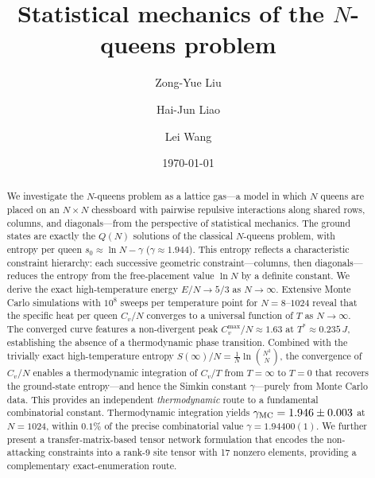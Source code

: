 \documentclass[aps, pre, reprint, amsmath, amssymb, superscriptaddress, floatfix]{revtex4-2}
\begin{document}
\title{Statistical mechanics of the $N$-queens problem}

\author{Zong-Yue Liu}

\author{Hai-Jun Liao}

\author{Lei Wang}

\date{\today}

\begin{abstract}
We investigate the $N$-queens problem as a lattice gas---a model in which $N$ queens
are placed on an $N \times N$ chessboard with pairwise repulsive
interactions along shared rows, columns, and diagonals---from the
perspective of statistical mechanics.  The
ground states are exactly the $Q(N)$ solutions of the classical
$N$-queens problem, with entropy per queen
$s_0 \approx \ln N - \gamma$ ($\gamma \approx 1.944$).
This entropy reflects a characteristic constraint hierarchy:
each successive geometric constraint---columns, then
diagonals---reduces the entropy from the free-placement value
$\ln N$ by a definite constant.
We derive the exact high-temperature energy $E/N \to 5/3$ as
$N \to \infty$.
Extensive Monte Carlo simulations with $10^8$ sweeps per temperature
point for $N = 8$--$1024$ reveal that the specific heat per queen
$C_v/N$ converges to a universal function of $T$ as $N \to \infty$.
The converged curve features a non-divergent peak
$C_v^{\max}/N \approx 1.63$ at $T^* \approx 0.235\,J$, establishing
the absence of a thermodynamic phase transition.
Combined with the trivially exact high-temperature entropy
$S(\infty)/N = \frac{1}{N}\ln\binom{N^2}{N}$, the
convergence of $C_v/N$ enables a thermodynamic integration of
$C_v/T$ from $T = \infty$ to $T = 0$ that recovers the ground-state
entropy---and hence the Simkin constant $\gamma$---purely from
Monte Carlo data.  This provides an independent
\emph{thermodynamic} route to a fundamental combinatorial constant.
Thermodynamic integration yields
$\gamma_{\rm MC} = 1.946 \pm 0.003$ at $N = 1024$, within $0.1\%$ of the
precise combinatorial value $\gamma = 1.94400(1)$.
We further present a transfer-matrix-based tensor network formulation
that encodes the non-attacking constraints into a rank-9 site tensor
with 17 nonzero elements, providing a complementary exact-enumeration
route.
\end{abstract}
\end{document}
